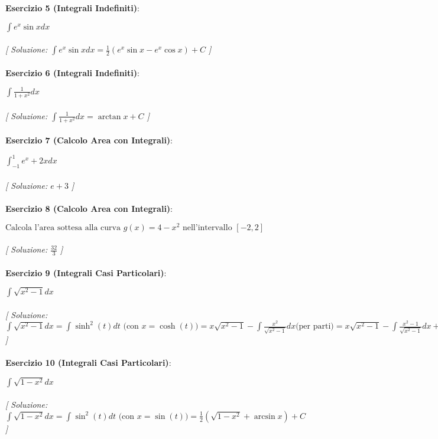 \documentclass{article}
\begin{document}
\textbf{Esercizio 5 (Integrali Indefiniti)}:\\
\par $\int e^x \sin x  dx$ \\\\

\textit{[ Soluzione: $\int e^x \sin x  dx = \frac{1}{2}(e^x\sin x - e^x\cos x) + C$ ]}\\\\

\textbf{Esercizio 6 (Integrali Indefiniti)}:\\
\par $\int \frac{1}{1 + x^2}  dx$ \\\\

\textit{[ Soluzione: $\int \frac{1}{1 + x^2}  dx = \arctan x + C$ ]}\\\\

\textbf{Esercizio 7 (Calcolo Area con Integrali)}:\\
\par $\int_{-1}^{1} e^x + 2x  dx$ \\\\

\textit{[ Soluzione: $e + 3$ ]}\\\\

\textbf{Esercizio 8 (Calcolo Area con Integrali)}:\\
\par $\text{Calcola l'area sottesa alla curva } g(x) = 4 - x^2 \text{ nell'intervallo } [-2, 2]$ \\\\

\textit{[ Soluzione: $\frac{32}{3}$ ]}\\\\

\textbf{Esercizio 9 (Integrali Casi Particolari)}:\\
\par $\int \sqrt{x^2-1}  dx$ \\\\

\textit{[ Soluzione: $\int \sqrt{x^2-1}  dx = \int \sinh^2(t) dt \text{ (con } x=\cosh(t))=x\sqrt{x^2-1}-\int \frac{x^2}{\sqrt{x^2-1}} dx \text{(per parti)}=x\sqrt{x^2-1}-\int \frac{x^2-1}{\sqrt{x^2-1}} dx+\int \frac{1}{\sqrt{x^2-1}} dx=\frac{1}{2}(x \sqrt{x^2-1}-\log{\sqrt{x^2-1} + x}) + C$ ]}\\\\

\textbf{Esercizio 10 (Integrali Casi Particolari)}:\\
\par $\int \sqrt{1-x^2} dx$ \\\\

\textit{[ Soluzione: $\int \sqrt{1-x^2}  dx = \int \sin^2(t) dt \text{ (con } x=\sin(t))=\frac{1}{2}(\sqrt{1-x^2}+\arcsin x) + C$ ]}\\\\
\end{document}
